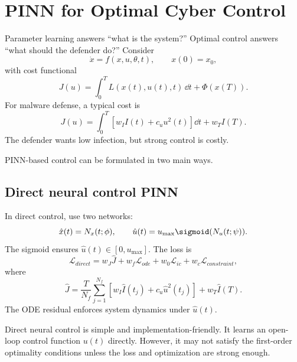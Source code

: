\documentclass[11pt,a4paper]{article}
\begin{document}
\section{PINN for Optimal Cyber Control}

Parameter learning answers ``what is the system?'' Optimal control answers ``what should the defender do?'' Consider
\begin{equation}
    \dot{x}=f(x,u,\theta,t),\qquad x(0)=x_0,
\end{equation}
with cost functional
\begin{equation}
    J(u)=\int_0^T L(x(t),u(t),t)\,\dd t+\Phi(x(T)).
\end{equation}
For malware defense, a typical cost is
\begin{equation}
    J(u)=\int_0^T \left[w_I I(t)+c_u u^2(t)\right]\dd t+w_T I(T).
\end{equation}
The defender wants low infection, but strong control is costly.

PINN-based control can be formulated in two main ways.

\subsection{Direct neural control PINN}
In direct control, use two networks:
\begin{equation}
    \hat{x}(t)=N_x(t;\phi), \qquad \hat{u}(t)=u_{\max}\sigmoid(N_u(t;\psi)).
\end{equation}
The sigmoid ensures $\hat{u}(t)\in[0,u_{\max}]$. The loss is
\begin{equation}
    \mathcal{L}_{direct}=w_J\widehat{J}+w_f\mathcal{L}_{ode}+w_0\mathcal{L}_{ic}+w_c\mathcal{L}_{constraint},
\end{equation}
where
\begin{equation}
    \widehat{J}=\frac{T}{N_f}\sum_{j=1}^{N_f}\left[w_I\hat{I}(t_j)+c_u\hat{u}^2(t_j)\right]+w_T\hat{I}(T).
\end{equation}
The ODE residual enforces system dynamics under $\hat{u}(t)$.

\begin{takeaway}
Direct neural control is simple and implementation-friendly. It learns an open-loop control function $u(t)$ directly. However, it may not satisfy the first-order optimality conditions unless the loss and optimization are strong enough.
\end{takeaway}
\end{document}
